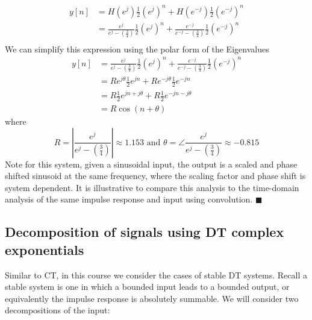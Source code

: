 \begin{example}
   \begin{align*}
     y[n] &= H\left(e^{j}\right)\frac{1}{2}\left(e^{j}\right)^n + H\left(e^{-j}\right)\frac{1}{2}\left(e^{-j}\right)^n\\
     &= \frac{e^{j}}{e^{j}-\left(\frac{3}{4}\right)}\frac{1}{2}\left(e^{j}\right)^n + \frac{e^{-j}}{e^{-j}-\left(\frac{3}{4}\right)}\frac{1}{2}\left(e^{-j}\right)^n\\
   \end{align*}
   We can simplify this expression using the polar form of the Eigenvalues
   \begin{align*}
     y[n] &= \frac{e^{j}}{e^{j}-\left(\frac{3}{4}\right)}\frac{1}{2}\left(e^{j}\right)^n + \frac{e^{-j}}{e^{-j}-\left(\frac{3}{4}\right)}\frac{1}{2}\left(e^{-j}\right)^n\\
     &= Re^{j\theta} \frac{1}{2}e^{jn} + Re^{-j\theta} \frac{1}{2}e^{-jn}\\
     &= R \frac{1}{2}e^{jn + j\theta} + R \frac{1}{2}e^{-jn -j\theta}\\
     &= R\cos(n + \theta)
   \end{align*}
   where
   \[
   R = \left|\frac{e^{j}}{e^{j}-\left(\frac{3}{4}\right)}\right| \approx 1.153  \mbox{ and } \theta = \angle{\frac{e^{j}}{e^{j}-\left(\frac{3}{4}\right)}} \approx -0.815
   \]
   Note for this system, given a sinusoidal input, the output is a scaled and phase shifted sinusoid at the same frequency, where the scaling factor and phase shift is system dependent. It is illustrative to compare this analysis to the time-domain analysis of the same impulse response and input using convolution.
   $\blacksquare$
\end{example}

\subsection{Decomposition of signals using DT complex exponentials}

Similar to CT, in this course we consider the cases of stable DT systems. Recall a stable system is one in which a bounded input leads to a bounded output, or equivalently the impulse response is absolutely summable. We will consider two decompositions of the input:

